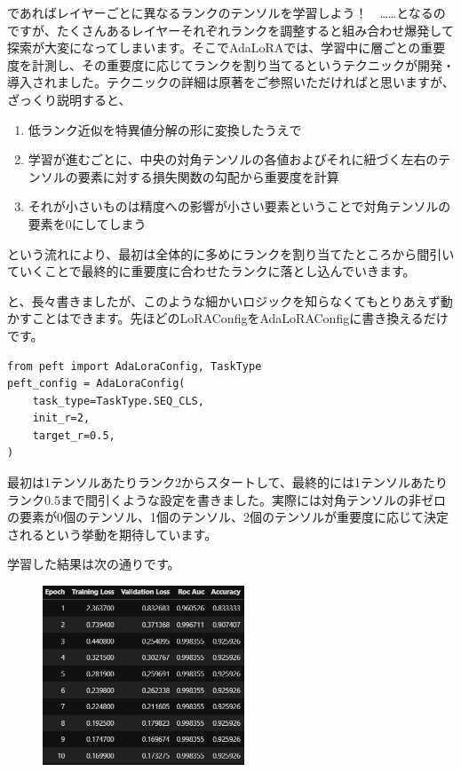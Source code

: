 \documentclass[a5paper,twoside,dvipdfmx]{jsarticle}
\begin{document}
であればレイヤーごとに異なるランクのテンソルを学習しよう！　……となるのですが、たくさんあるレイヤーそれぞれランクを調整すると組み合わせ爆発して探索が大変になってしまいます。そこでAdaLoRAでは、学習中に層ごとの重要度を計測し、その重要度に応じてランクを割り当てるというテクニックが開発・導入されました。テクニックの詳細は原著をご参照いただければと思いますが、ざっくり説明すると、

\begin{enumerate}
  \item 低ランク近似を特異値分解の形に変換したうえで
  \item 学習が進むごとに、中央の対角テンソルの各値およびそれに紐づく左右のテンソルの要素に対する損失関数の勾配から重要度を計算
  \item それが小さいものは精度への影響が小さい要素ということで対角テンソルの要素を0にしてしまう
\end{enumerate}

という流れにより、最初は全体的に多めにランクを割り当てたところから間引いていくことで最終的に重要度に合わせたランクに落とし込んでいきます。

と、長々書きましたが、このような細かいロジックを知らなくてもとりあえず動かすことはできます。先ほどのLoRAConfigをAdaLoRAConfigに書き換えるだけです。

\begin{lstlisting}
from peft import AdaLoraConfig, TaskType
peft_config = AdaLoraConfig(
    task_type=TaskType.SEQ_CLS,
    init_r=2,
    target_r=0.5,
)
\end{lstlisting}

最初は1テンソルあたりランク2からスタートして、最終的には1テンソルあたりランク0.5まで間引くような設定を書きました。実際には対角テンソルの非ゼロの要素が0個のテンソル、1個のテンソル、2個のテンソルが重要度に応じて決定されるという挙動を期待しています。

学習した結果は次の通りです。


\begin{figure}[h]
  \centering
  \includegraphics[width=60mm]{../C105Fig/gray/adalora_train.png}
 \end{figure} 
\end{document}
